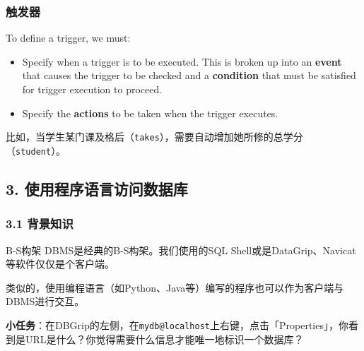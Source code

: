 \documentclass[aspectratio=169, 14pt]{beamer}
\begin{document}
\begin{frame}
	\frametitle{触发器}
	To define a trigger, we must:

	\begin{itemize}
		\item Specify when a trigger is to be executed. This is broken up into an \textbf{event} that causes the trigger to be checked and a \textbf{condition} that must be satisfied for trigger execution to proceed.
		\item Specify the \textbf{actions} to be taken when the trigger executes.
	\end{itemize}

	 比如，当学生某门课及格后（\texttt{takes}），需要自动增加她所修的总学分（\texttt{student}）。
\end{frame}

\begin{frame}[fragile]
	\section{\textcolor{darkmidnightblue}{3. 使用程序语言访问数据库}}
	\begin{center}
		{\Huge {}   }

		{\Huge {}}

		{\Huge {}}
	\end{center}

\end{frame}

\begin{frame}
	\frametitle{3.1 背景知识}
	\begin{exampleblock}{B-S构架}
		DBMS是经典的B-S构架。我们使用的SQL Shell或是DataGrip、Navicat等软件仅仅是个客户端。
	\end{exampleblock}

	类似的，使用编程语言（如Python、Java等）编写的程序也可以作为客户端与DBMS进行交互。

	 \textbf{小任务}：在DBGrip的左侧，在\texttt{mydb@localhost}上右键，点击「Properties」，你看到是URL是什么？你觉得需要什么信息才能唯一地标识一个数据库？

\end{frame}
\end{document}
